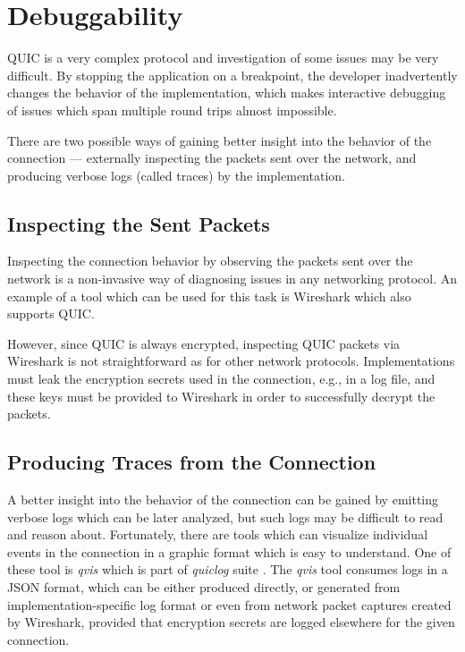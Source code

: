 \section{Debuggability}

QUIC is a very complex protocol and investigation of some issues may be very difficult. By stopping
the application on a breakpoint, the developer inadvertently changes the behavior of the
implementation, which makes interactive debugging of issues which span multiple round trips almost
impossible.

There are two possible ways of gaining better insight into the behavior of the connection ---
externally inspecting the packets sent over the network, and producing verbose logs (called traces)
by the implementation.

\subsection{Inspecting the Sent Packets}

Inspecting the connection behavior by observing the packets sent over the network is a non-invasive
way of diagnosing issues in any networking protocol. An example of a tool which can be used for this
task is Wireshark \cite{web:wireshark} which also supports QUIC.

However, since QUIC is always encrypted, inspecting QUIC packets via Wireshark is not
straightforward as for other network protocols. Implementations must leak the encryption secrets
used in the connection, e.g., in a log file, and these keys must be provided to Wireshark in order
to successfully decrypt the packets.

\subsection{Producing Traces from the Connection}

A better insight into the behavior of the connection can be gained by emitting verbose logs which
can be later analyzed, but such logs may be difficult to read and reason about. Fortunately, there
are tools which can visualize individual events in the connection in a graphic format which is easy
to understand. One of these tool is \textit{qvis} \cite{web:qvis} which is part of \textit{quiclog}
suite \cite{githubquiclog}. The \textit{qvis} tool consumes logs in a JSON format, which can be
either produced directly, or generated from implementation-specific log format or even from network
packet captures created by Wireshark, provided that encryption secrets are logged elsewhere for the
given connection.

